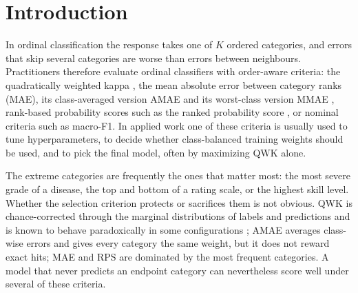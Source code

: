 \documentclass[pdflatex,sn-mathphys-ay]{sn-jnl}
\theoremstyle{thmstyleone}
\theoremstyle{thmstylethree}
\begin{document}

\maketitle

\section{Introduction}\label{sec:intro}

In ordinal classification the response takes one of $K$ ordered categories, and errors that skip several categories are worse than errors between neighbours. Practitioners therefore evaluate ordinal classifiers with order-aware criteria: the quadratically weighted kappa \citep[QWK;][]{Cohen1968}, the mean absolute error between category ranks (MAE), its class-averaged version AMAE \citep{Baccianella2009} and its worst-class version MMAE \citep{CruzRamirez2014}, rank-based probability scores such as the ranked probability score \citep[RPS;][]{Epstein1969}, or nominal criteria such as macro-F1. In applied work one of these criteria is usually used to tune hyperparameters, to decide whether class-balanced training weights should be used, and to pick the final model, often by maximizing QWK alone.

The extreme categories are frequently the ones that matter most: the most severe grade of a disease, the top and bottom of a rating scale, or the highest skill level. Whether the selection criterion protects or sacrifices them is not obvious. QWK is chance-corrected through the marginal distributions of labels and predictions and is known to behave paradoxically in some configurations \citep{Warrens2012}; AMAE averages class-wise errors and gives every category the same weight, but it does not reward exact hits; MAE and RPS are dominated by the most frequent categories. A model that never predicts an endpoint category can nevertheless score well under several of these criteria.
\end{document}
